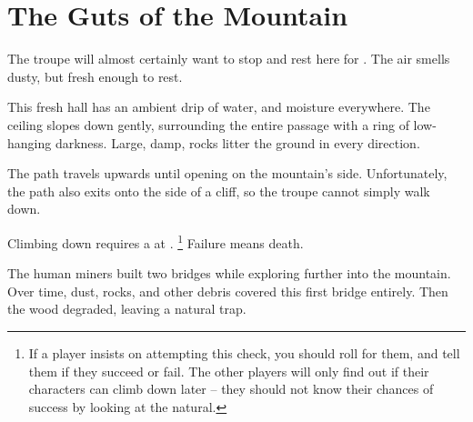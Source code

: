 \section{The Guts of the Mountain}

\begin{multicols}{2}

\renewcommand\npcsymbol{\glsentrysymbol{yonder}}

The troupe will almost certainly want to stop and rest here for .
The air smells dusty, but fresh enough to rest.

\begin{boxtext}
  This fresh hall has an ambient drip of water, and moisture everywhere.
  The ceiling slopes down gently, surrounding the entire passage with a ring of low-hanging darkness.
  Large, damp, rocks litter the ground in every direction.
\end{boxtext}






The path travels upwards until opening on the mountain's side.
Unfortunately, the path also exits onto the side of a cliff, so the troupe cannot simply walk down.

Climbing down requires a  at \tn[14].%
\footnote{If a player insists on attempting this check, you should roll for them, and tell them if they succeed or fail.  The other players will only find out if their characters can climb down later -- they should not know their chances of success by looking at the \gls{natural}.}
Failure means death.



\begin{exampletext}
  The human miners built two bridges while exploring further into the mountain.
  Over time, dust, rocks, and other debris covered this first bridge entirely.
  Then the wood degraded, leaving a natural trap.


\end{exampletext}
\end{multicols}
